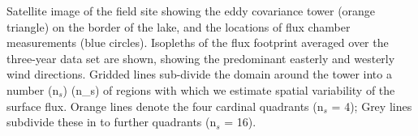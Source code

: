 \label{fig:fp_on_map_Stordalen} Satellite image of the field
site showing the eddy covariance tower (orange triangle) on the border
of the lake, and the locations of flux chamber measurements (blue
circles). Isopleths of the flux footprint averaged over the three-year
data set are shown, showing the predominant easterly and westerly wind
directions. Gridded lines sub-divide the domain around the tower into a
number (n\(_s\)) (n_s) of regions with which we estimate spatial variability of
the surface flux. Orange lines denote the four cardinal quadrants
(n\(_s\) = 4); Grey lines subdivide these in to further quadrants
(n\(_s\) = 16).
